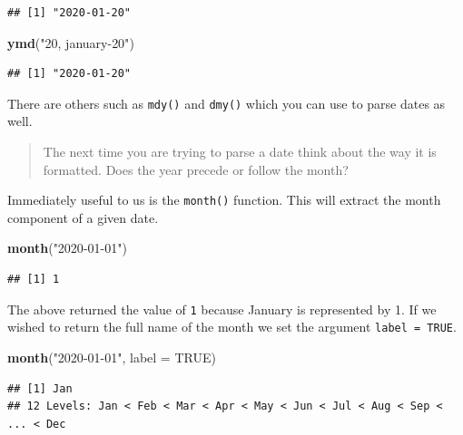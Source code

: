 \documentclass[
]{book}
\newenvironment{Shaded}{\begin{snugshade}}{\end{snugshade}}
\newcommand{\DataTypeTok}[1]{\textcolor[rgb]{0.13,0.29,0.53}{#1}}
\newcommand{\KeywordTok}[1]{\textcolor[rgb]{0.13,0.29,0.53}{\textbf{#1}}}
\newcommand{\NormalTok}[1]{#1}
\newcommand{\OtherTok}[1]{\textcolor[rgb]{0.56,0.35,0.01}{#1}}
\newcommand{\StringTok}[1]{\textcolor[rgb]{0.31,0.60,0.02}{#1}}
\begin{document}
\begin{verbatim}
## [1] "2020-01-20"
\end{verbatim}

\begin{Shaded}
\begin{Highlighting}[]
\KeywordTok{ymd}\NormalTok{(}\StringTok{"20, january{-}20"}\NormalTok{)}
\end{Highlighting}
\end{Shaded}

\begin{verbatim}
## [1] "2020-01-20"
\end{verbatim}

There are others such as \texttt{mdy()} and \texttt{dmy()} which you can use to parse dates as well.

\begin{quote}
The next time you are trying to parse a date think about the way it is formatted. Does the year precede or follow the month?
\end{quote}

Immediately useful to us is the \texttt{month()} function. This will extract the month component of a given date.

\begin{Shaded}
\begin{Highlighting}[]
\KeywordTok{month}\NormalTok{(}\StringTok{"2020{-}01{-}01"}\NormalTok{)}
\end{Highlighting}
\end{Shaded}

\begin{verbatim}
## [1] 1
\end{verbatim}

The above returned the value of \texttt{1} because January is represented by 1. If we wished to return the full name of the month we set the argument \texttt{label\ =\ TRUE}.

\begin{Shaded}
\begin{Highlighting}[]
\KeywordTok{month}\NormalTok{(}\StringTok{"2020{-}01{-}01"}\NormalTok{, }\DataTypeTok{label =} \OtherTok{TRUE}\NormalTok{)}
\end{Highlighting}
\end{Shaded}

\begin{verbatim}
## [1] Jan
## 12 Levels: Jan < Feb < Mar < Apr < May < Jun < Jul < Aug < Sep < ... < Dec
\end{verbatim}
\end{document}
